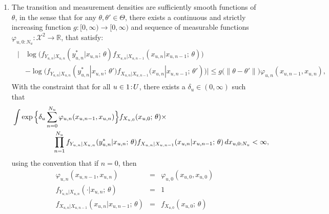 \documentclass[12pt]{article}\usepackage[]{graphicx}\usepackage[]{xcolor}
\begin{document}
\begin{appendices}
\begin{enumerate}[resume,label=(B\arabic*), ref=(B\arabic*)]
    \item The transition and measurement densities are sufficiently smooth functions of $\theta$, in the sense that for any $\theta, \theta' \in \Theta$, there exists  a continuous and strictly increasing function $g: [0, \infty) \rightarrow [0, \infty)$ and sequence of measurable functions $\varphi_{u, 0:N_u}: \mathcal{X}^2 \rightarrow \mathbb{R}$, that satisfy:
    \begin{align*}
    \begin{split}
    |&\log\big(f_{Y_{u, n}|X_{u, n}}(y^*_{u, n}|x_{u, n};\, \theta)f_{X_{u, n}|X_{u, n-1}}(x_{u, n}|x_{u, n-1};\, \theta)\big) \\
    & - \log\big(f_{Y_{u, n}|X_{u, n}}(y^*_{u, n}|x_{u, n};\, \theta')f_{X_{u, n}|X_{u, n-1}}(x_{u, n}|x_{u, n-1};\, \theta')\big)| \leq g\big(\|\theta - \theta'\|\big)\varphi_{u, n}(x_{u, n-1}, x_{u, n}),
    \end{split}
    \end{align*}
    With the constraint that for all $u\in {1}\!:\!{U}$, there exists a $\delta_u \in (0, \infty)$ such that
    \begin{align*}
    &  \int \exp\Big\{\delta_u \sum_{n = 0}^{N_u}\varphi_{u, n}(x_{u, n-1}, x_{u, n})\Big\} f_{X_{u, 0}}(x_{u, 0};\, \theta) \times
    \\
    & \hspace{20mm} \prod_{n = 1}^{N_u}f_{Y_{u, n}|X_{u, n}}(y^*_{u, n}|x_{u, n};\, \theta)f_{X_{u, n}|X_{u, n-1}}(x_{u, n}|x_{u, n-1};\, \theta)\, dx_{u, 0:N_u} < \infty,
    \end{align*}
    using the convention that if $n=0$, then
    \begin{eqnarray*}
      \varphi_{u, n}(x_{u, n-1}, x_{u, n}) &=& \varphi_{u, 0}(x_{u, 0}, x_{u, 0})
      \\
      f_{Y_{u, n}|X_{u, n}}(\cdot | x_{u, n}; \, \theta) &=& 1
      \\
      f_{X_{u, n} | X_{u, n-1}}(x_{u, n}|x_{u, n-1};\, \theta) &=& f_{X_{u, 0}}(x_{u, 0}; \, \theta)
    \end{eqnarray*}\label{assumption:mle3}
\end{enumerate}
\vspace{-13mm}
\noindent{}



\end{appendices}
\end{document}
